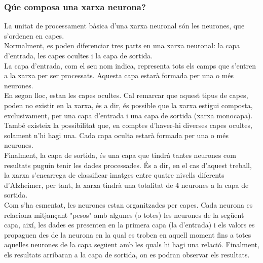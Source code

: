 \documentclass[a4paper,12pt]{article}
\begin{document}
\subsubsection*{Qúe composa una xarxa neurona?}
La unitat de processament bàsica d'una xarxa neuronal són les neurones, que s'ordenen en capes.\\
Normalment, es poden diferenciar tres parts en una xarxa neuronal: la capa d'entrada, les capes ocultes i la capa de sortida.\\
La capa d'entrada, com el seu nom indica, representa tots els camps que s'entren a la xarxa per ser processats. Aquesta capa estarà formada per una o més neurones.\\
En segon lloc, estan les capes ocultes. Cal remarcar que aquest tipus de capes, poden no existir en la xarxa, és a dir, és possible que la xarxa estigui composta, exclusivament, per una capa d'entrada i una capa de sortida (xarxa monocapa). També existeix la possibilitat que, en comptes d'haver-hi diverses capes ocultes, solament n'hi hagi una. Cada capa oculta estarà formada per una o més neurones.\\
Finalment, la capa de sortida, és una capa que tindrà tantes neurones com resultats puguin tenir les dades processades. És a dir, en el cas d'aquest treball, la xarxa s'encarrega de classificar imatges entre quatre nivells diferents d'Alzheimer, per tant, la xarxa tindrà una totalitat de 4 neurones a la capa de sortida.\\
Com s'ha esmentat, les neurones estan organitzades per capes. Cada neurona es relaciona mitjançant "pesos" amb algunes (o totes) les neurones de la següent capa, així, les dades es presenten en la primera capa (la d'entrada) i els valors es propaguen des de la neurona en la qual es troben en aquell moment fins a totes aquelles neurones de la capa següent amb les quals hi hagi una relació. Finalment, els resultats arribaran a la capa de sortida, on es podran observar els resultats.
\end{document}
